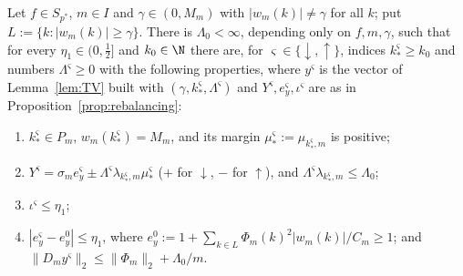 \begin{lemma}\label{lem:transferdata}
Let $f\in S_{p^*}$, $m\in I$ and $\gamma\in(0,M_m)$ with $|w_m(k)|\ne\gamma$
for all $k$; put $L:=\{k:|w_m(k)|\ge\gamma\}$.  There is $\Lambda_0<\infty$,
depending only on $f,m,\gamma$, such that for every $\eta_1\in(0,\frac12]$
and $k_0\in\N$ there are, for $\varsigma\in\{\downarrow,\uparrow\}$,
indices $k_*^\varsigma\ge k_0$ and numbers $\Lambda^\varsigma\ge0$ with the
following properties, where $y^\varsigma$ is the vector of
Lemma~\ref{lem:TV} built with $(\gamma,k_*^\varsigma,\Lambda^\varsigma)$ and
$Y^\varsigma,e^\varsigma_y,\iota^\varsigma$ are as in
Proposition~\ref{prop:rebalancing}:
\begin{enumerate}
\item[(a)] $k_*^\varsigma\in P_m$, $w_m(k_*^\varsigma)=M_m$, and its margin
$\mu^\varsigma_*:=\mu_{k_*^\varsigma,m}$ is positive;
\item[(b)] $Y^\varsigma=\sigma_me^\varsigma_y\pm\Lambda^\varsigma
\lambda_{k_*^\varsigma,m}\mu^\varsigma_*$ \textup{(}$+$ for $\downarrow$, $-$
for $\uparrow$\textup{)}, and $\Lambda^\varsigma\lambda_{k^\varsigma_*,m}\le
\Lambda_0$;
\item[(c)] $\iota^\varsigma\le\eta_1$;
\item[(d)] $|e^\varsigma_y-e^0_y|\le\eta_1$, where
$e^0_y:=1+\sum_{k\in L}\Phi_m(k)^2|w_m(k)|/C_m\ge1$; and
$\|D_my^\varsigma\|_2\le\|\Phi_m\|_2+\Lambda_0/m$.
\end{enumerate}
\end{lemma}

